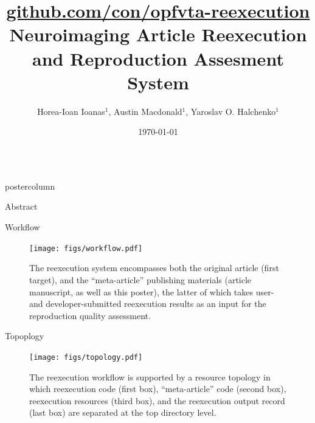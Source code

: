 

\title{
	\href{https://github.com/con/opfvta-reexecution}{
		\Large github.com/con/opfvta-reexecution
	}\\\vspace{.15em}
	Neuroimaging Article Reexecution and Reproduction Assesment System
}
\author{
	Horea-Ioan Ioanas$^{1}$,
	Austin Macdonald$^{1}$,
	Yaroslav O. Halchenko$^{1}$
}
\date{\today}

\newlength{\columnheight}
\setlength{\columnheight}{0.881\textheight}



\begin{frame}
\begin{columns}
	\begin{column}{.42\textwidth}
		\begin{beamercolorbox}[center]{postercolumn}
			\begin{minipage}{.98\textwidth}  %
				\parbox[t][\columnheight]{\textwidth}{ %
					\begin{myblock}{Abstract}
						
					\end{myblock}\vfill
					\vspace{-0.3em}
					\begin{myblock}{Workflow}
						\vspace{0.5em}
						\begin{figure}
							\texttt{[image: figs/workflow.pdf]}
							\caption{
								The reexecution system encompasses both the original article (first target), and the “meta-article” publishing materials (article manuscript, as well as this poster), the latter of which takes user- and developer-submitted reexecution results as an input for the reproduction quality assessment.
							}
						\end{figure}
					\end{myblock}\vfill
					\vspace{-0.3em}
					\begin{myblock}{Topoplogy}
						\vspace{0.5em}
						\begin{figure}
							\captionsetup{width=.9\linewidth}
							\texttt{[image: figs/topology.pdf]}
							\caption{
								The reexecution workflow is supported by a resource topology in which reexecution code (first box), “meta-article” code (second box), reexecution resources (third box), and the reexecution output record (last box) are separated at the top directory level.
}
\end{figure}
\end{myblock}}
\end{minipage}
\end{beamercolorbox}
\end{column}
\end{columns}
\end{frame}

